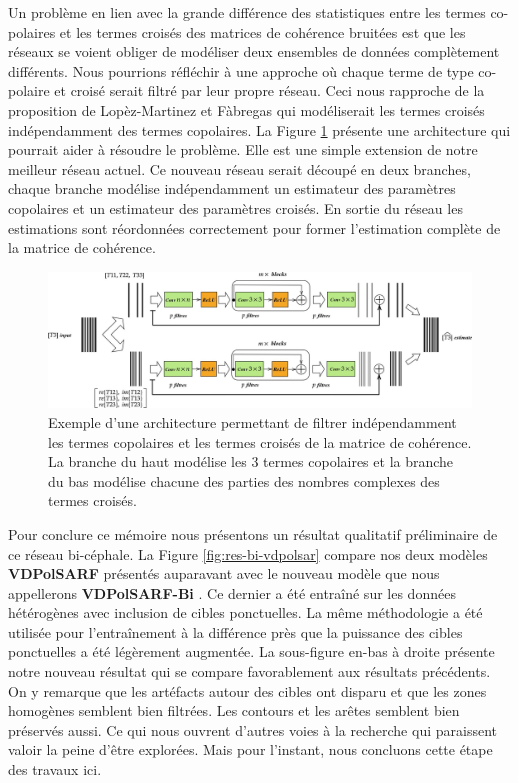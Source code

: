Un problème en lien avec la grande différence des statistiques entre les termes co-polaires et les termes croisés des matrices de cohérence bruitées est que les réseaux se voient obliger de modéliser deux ensembles de données complètement différents.  Nous pourrions réfléchir à une approche où chaque terme de type co-polaire et croisé serait filtré par leur propre réseau. Ceci nous rapproche de la proposition de Lopèz-Martinez et Fàbregas \cite{Lopez2003} qui modéliserait les termes croisés indépendamment des termes copolaires.  La Figure \ref{fig:bi-vdpolsar} présente une architecture qui pourrait aider à résoudre le problème. Elle  est une simple extension de notre meilleur réseau actuel. Ce nouveau réseau serait découpé en deux branches, chaque branche modélise indépendamment un estimateur des paramètres copolaires et un estimateur des paramètres croisés.  En sortie du réseau les estimations sont réordonnées correctement pour former l'estimation complète de la matrice de cohérence.
 
 \begin{figure}
  \includegraphics[width=1.0\linewidth]{figures/Conclusion/diagram-20191202.jpg}
  \centering
  \caption{
  \footnotesize{Exemple d'une architecture permettant de filtrer indépendamment les termes copolaires et les termes croisés de la matrice de cohérence. La branche du haut modélise les 3 termes copolaires et la branche du bas modélise chacune des parties des nombres complexes des termes croisés.}
  }
  \label{fig:bi-vdpolsar}
\end{figure}

Pour conclure ce mémoire nous présentons un résultat qualitatif préliminaire de ce réseau bi-céphale.  La Figure \ref{fig:res-bi-vdpolsar} compare nos deux modèles \textbf{VDPolSARF}  présentés auparavant avec le nouveau modèle que nous appellerons \textbf{VDPolSARF-Bi} .  Ce dernier a été entraîné sur les données hétérogènes avec inclusion de cibles ponctuelles. La même méthodologie a été utilisée pour l'entraînement à la différence près que la puissance des cibles ponctuelles a été légèrement augmentée.  La sous-figure en-bas à droite présente notre nouveau résultat qui se compare favorablement aux résultats précédents.  On y remarque que les artéfacts autour des cibles ont disparu et que les zones homogènes semblent bien filtrées.  Les contours et les arêtes semblent bien préservés aussi.  Ce qui nous ouvrent d'autres voies à la recherche qui paraissent valoir la peine d'être explorées.  Mais pour l'instant, nous concluons cette étape des travaux ici.

